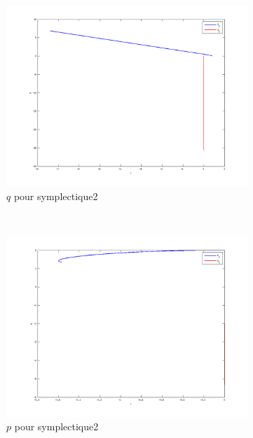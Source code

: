 \begin{figure}
  \begin{subfigure}[b]{0.3\textwidth}
    \includegraphics[width=\textwidth]{images/Q2_symplectique2_q.png}
    \caption{$q$ pour symplectique2}
    \label{fig:q2_symplectique2_q}
  \end{subfigure}%
  ~
  \begin{subfigure}[b]{0.3\textwidth}
    \includegraphics[width=\textwidth]{images/Q2_symplectique2_p.png}
    \caption{$p$ pour symplectique2}
    \label{fig:q2_symplectique2_p}
  \end{subfigure}
  ~
  \begin{subfigure}[b]{0.3\textwidth}

\end{subfigure}
\end{figure}
